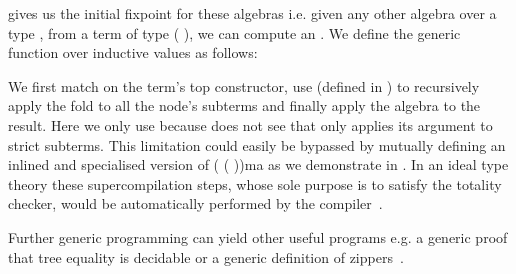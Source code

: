  gives us the initial fixpoint for these algebras i.e.
given any other algebra over a type , from a term of
type ( ), we can compute an .
%
We define the generic  function over inductive values
as follows:


We first match on the term's top constructor, use 
(defined in )
to recursively apply the fold to all the node's subterms and finally
apply the algebra to the result.
%
Here we only use \assertTotal{} because \idris{} does not see that
 only applies its argument to strict subterms.
This limitation could easily be bypassed by mutually defining
an inlined and specialised version of
( \IdrisKeyword{\KatlaUnderscore} ( ))ma
as we demonstrate in .
%
In an ideal type theory these supercompilation steps, whose sole
purpose is to satisfy the totality checker, would be automatically
performed by the compiler~\citep{MANUAL:phd/dublin/Mendel12}.


Further generic programming can yield other useful programs e.g. a
generic proof that tree equality is decidable or a generic definition
of zippers~\citep{DBLP:conf/icfp/LohM11}.
